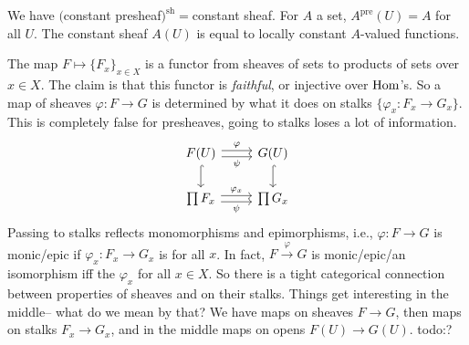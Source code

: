 \begin{example}
    We have $($constant presheaf$)^{ \mathrm{sh}}=$constant sheaf. For $A$ a set, $A^{\mathrm{pre}}(U)=A$ for all $U$. The constant sheaf $A(U)$ is equal to locally constant $A$-valued functions.
\end{example}
The map $F \mapsto \{F_x\} _{x \in X}$ is a functor from sheaves of sets to products of sets over $x \in X$. The claim is that this functor is \emph{faithful}, or injective over $\operatorname{Hom}$'s. So a map of sheaves $\varphi  \colon F \to G$ is determined by what it does on stalks $\{\varphi _x \colon F_x \to G_x\} $. This is completely false for presheaves, going to stalks loses a lot of information. \[
\begin{tikzcd}
F(U) \arrow[r, "\varphi", shift left] \arrow[r, "\psi"', shift right] \arrow[d, hook] & G(U) \arrow[d, hook] \\
\prod F_x \arrow[r, "\varphi_x", shift left] \arrow[r, "\psi"', shift right]          & \prod G_x           
\end{tikzcd}
\] Passing to stalks reflects monomorphisms and epimorphisms, i.e., $\varphi  \colon F \to G$ is monic/epic if $\varphi _x \colon  F_x\to G_x$ is for all $x$. In fact, $F \xrightarrow{\varphi } G$ is monic/epic/an isomorphism iff the $\varphi _x$ for all $x \in X$. So there is a tight categorical connection between properties of sheaves and on their stalks. Things get interesting in the middle-- what do we mean by that? We have maps on sheaves $F \to G$, then maps on stalks $F_x \to G_x$, and in the middle maps on opens $F(U) \to G(U)$. {\color{red}todo:?} 

